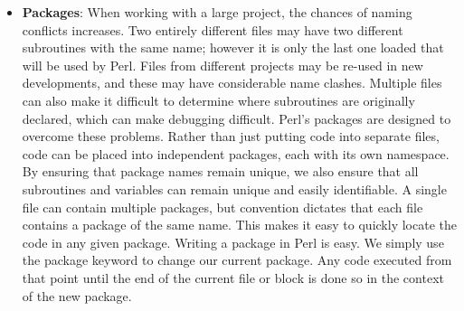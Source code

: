 \documentclass{report}
\begin{document}
\begin{itemize}
\begin{perlcode}
                print "English: ", hello("en"), "\n"; # Prints "Hello"
                print "Australian: ", hello("en-au"),"\n"; # Prints "G’day"
            \end{perlcode}
        \item \textbf{Packages}: When working with a large project, the chances of naming conflicts increases. Two entirely different files may have two different subroutines with the same name; however it is only the last one loaded that will be used by Perl. Files from different projects may be re-used in new developments, and these may have considerable name clashes. Multiple files can also make it difficult to determine where subroutines are originally declared, which can make debugging difficult.
            \bigbreak \noindent 
            Perl’s packages are designed to overcome these problems. Rather than just putting code into separate files, code can be placed into independent packages, each with its own namespace. By ensuring that package names remain unique, we also ensure that all subroutines and variables can remain unique and easily identifiable.
            \bigbreak \noindent 
            A single file can contain multiple packages, but convention dictates that each file contains a package of the same name. This makes it easy to quickly locate the code in any given package.
            \bigbreak \noindent 
            Writing a package in Perl is easy. We simply use the package keyword to change our current package. Any code executed from that point until the end of the current file or block is done so in the context of the new package.
            \bigbreak \noindent 
\end{itemize}
\end{document}
